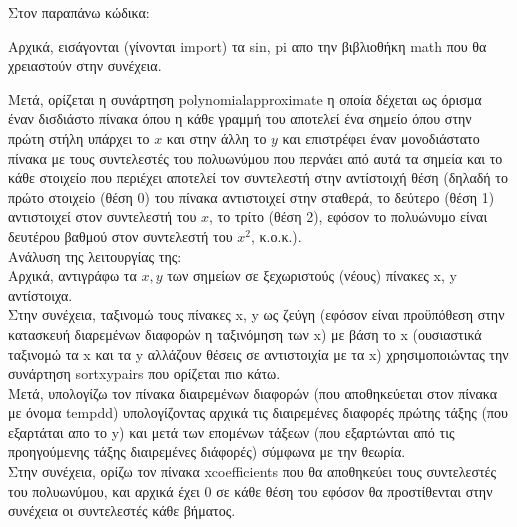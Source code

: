 \documentclass[a4paper,11pt]{article}
\newcommand{\lt}{\latintext}
\begin{document}
\par
Στον παραπάνω κώδικα:\\
\par
Αρχικά, εισάγονται (γίνονται {\lt import}) τα {\lt sin, pi} απο την βιβλιοθήκη {\lt math} που θα χρειαστούν στην συνέχεια.\\

\par
Μετά, ορίζεται η συνάρτηση {\lt polynomial\textunderscore approximate} η οποία δέχεται ως όρισμα έναν δισδιάστο πίνακα όπου η κάθε γραμμή του αποτελεί ένα σημείο όπου στην πρώτη στήλη υπάρχει το {\lt $x$} και στην άλλη το {\lt $y$} και επιστρέφει έναν μονοδιάστατο πίνακα με τους συντελεστές του πολυωνύμου που περνάει από αυτά τα σημεία και το κάθε στοιχείο που περιέχει αποτελεί τον συντελεστή στην αντίστοιχή θέση (δηλαδή το πρώτο στοιχείο (θέση 0) του πίνακα αντιστοιχεί στην σταθερά, το δεύτερο (θέση 1) αντιστοιχεί στον συντελεστή του {\lt $x$}, το τρίτο (θέση 2), εφόσον το πολυώνυμο είναι δευτέρου βαθμού στον συντελεστή του {\lt $x^2$}, κ.ο.κ.).\\
Ανάλυση της λειτουργίας της:\\
Αρχικά, αντιγράφω τα {\lt $x, y$} των σημείων σε ξεχωριστούς (νέους) πίνακες {\lt x, y} αντίστοιχα.\\
Στην συνέχεια, ταξινομώ τους πίνακες {\lt x, y} ως ζεύγη (εφόσον είναι προϋπόθεση στην κατασκευή διαρεμένων διαφορών η ταξινόμηση των {\lt x}) με βάση το {\lt x} (ουσιαστικά ταξινομώ τα {\lt x} και τα {\lt y} αλλάζουν θέσεις σε αντιστοιχία με τα {\lt x}) χρησιμοποιώντας την συνάρτηση {\lt sort\textunderscore xy\textunderscore pairs} που ορίζεται πιο κάτω.\\
Μετά, υπολογίζω τον πίνακα διαιρεμένων διαφορών (που αποθηκεύεται στον πίνακα με όνομα {\lt temp\textunderscore dd}) υπολογίζοντας αρχικά τις διαιρεμένες διαφορές πρώτης τάξης (που εξαρτάται απο το {\lt y}) και μετά των επομένων τάξεων (που εξαρτώνται από τις προηγούμενης τάξης διαιρεμένες διάφορές) σύμφωνα με την θεωρία.\\
Στην συνέχεια, ορίζω τον πίνακα {\lt x\textunderscore coefficients} που θα αποθηκεύει τους συντελεστές του πολυωνύμου, και αρχικά έχει 0 σε κάθε θέση του εφόσον θα προστίθενται στην συνέχεια οι συντελεστές κάθε βήματος.\\
\end{document}
